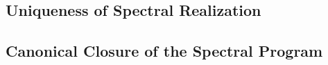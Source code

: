 \subsection{Uniqueness of Spectral Realization}










\subsection{Canonical Closure of the Spectral Program}






